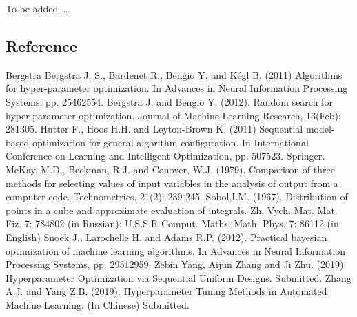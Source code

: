 \documentclass[letterpaper,10pt,english]{sphinxmanual}
\begin{document}
To be added …


\subsection{Reference}
\label{\detokenize{resources:reference}}
\begin{sphinxthebibliography}{Bergstra}
Bergstra J. S., Bardenet R., Bengio Y. and Kégl B. (2011) Algorithms for hyper-parameter optimization. In Advances in Neural Information Processing Systems, pp. 2546\textendash{}2554.
Bergstra J. and Bengio Y. (2012). Random search for hyper-parameter optimization. Journal of Machine Learning Research, 13(Feb): 281\textendash{}305.
Hutter F., Hoos H.H. and Leyton-Brown K. (2011) Sequential model-based optimization for general algorithm configuration. In International Conference on Learning and Intelligent Optimization, pp. 507\textendash{}523. Springer.
McKay, M.D., Beckman, R.J. and Conover, W.J. (1979). Comparison of three methods for selecting values of input variables in the analysis of output from a computer code. Technometrics, 21(2): 239-245.
Sobol,I.M. (1967), Distribution of points in a cube and approximate evaluation of integrals. Zh. Vych. Mat. Mat. Fiz. 7: 784\textendash{}802 (in Russian); U.S.S.R Comput. Maths. Math. Phys. 7: 86\textendash{}112 (in English)
Snoek J., Larochelle H. and Adams R.P. (2012). Practical bayesian optimization of machine learning algorithms. In Advances in Neural Information Processing Systems, pp. 2951\textendash{}2959.
Zebin Yang, Aijun Zhang and Ji Zhu. (2019) Hyperparameter Optimization via Sequential Uniform Designs. Submitted.
Zhang A.J. and Yang Z.B. (2019). Hyperparameter Tuning Methods in Automated Machine Learning. (In Chinese) Submitted.
\end{sphinxthebibliography}
\end{document}
